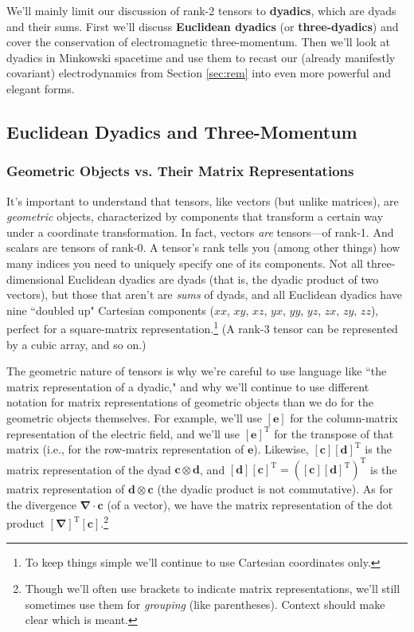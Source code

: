 \documentclass[12pt]{article}
\renewcommand{\vv}[1]{\mathbf{#1}}
\newcommand{\del}{\boldsymbol{\nabla}}
\begin{document}
We'll mainly limit our discussion of rank-2 tensors to \textbf{dyadics}, which are dyads and their sums. First we'll discuss \textbf{Euclidean dyadics} (or \textbf{three-dyadics}) and cover the conservation of electromagnetic three-momentum. Then we'll look at dyadics in Minkowski spacetime and use them to recast our (already manifestly covariant) electrodynamics from Section \ref{sec:rem} into even more powerful and elegant forms.

\subsection{Euclidean Dyadics and Three-Momentum}\label{ssec:emm}

\subsubsection{Geometric Objects vs. Their Matrix Representations}

It's important to understand that tensors, like vectors (but unlike matrices), are \emph{geometric} objects, characterized by components that transform a certain way under a coordinate transformation. In fact, vectors \emph{are} tensors---of rank-1. And scalars are tensors of rank-0. A tensor's rank tells you (among other things) how many indices you need to uniquely specify one of its components. Not all three-dimensional Euclidean dyadics are dyads (that is, the dyadic product of two vectors), but those that aren't are \emph{sums} of dyads, and all Euclidean dyadics have nine ``doubled up" Cartesian components ($xx$, $xy$, $xz$, $yx$, $yy$, $yz$, $zx$, $zy$, $zz$), perfect for a square-matrix representation.\footnote{To keep things simple we'll continue to use Cartesian coordinates only.} (A rank-3 tensor can be represented by a cubic array, and so on.)

The geometric nature of tensors is why we're careful to use language like ``the matrix representation of a dyadic," and why we'll continue to use different notation for matrix representations of geometric objects than we do for the geometric objects themselves. For example, we'll use $[\vv e]$ for the column-matrix representation of the electric field, and we'll use $[\vv e]^{\textrm{T}}$ for the transpose of that matrix (i.e., for the row-matrix representation of $\vv e$). Likewise, $[\vv c][\vv d]^{\textrm{T}}$ is the matrix representation of the dyad $\vv c \otimes \vv d$, and ${[\vv d][\vv c]^{\textrm{T}} = ([\vv c][\vv d]^{\textrm{T}})^{\textrm{T}}}$ is the matrix representation of $\vv d \otimes \vv c$ (the dyadic product is not commutative). As for the divergence $\del \cdot \vv c$ (of a vector), we have the matrix representation of the dot product $[\del]^{\textrm{T}}[\vv c]$.\footnote{Though we'll often use brackets to indicate matrix representations, we'll still sometimes use them for \emph{grouping} (like parentheses). Context should make clear which is meant.}
\end{document}
